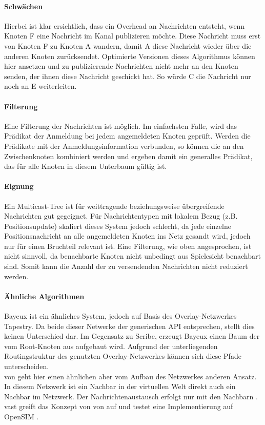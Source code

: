 \paragraph*{Schwächen}
Hierbei ist klar ersichtlich, dass ein Overhead an Nachrichten entsteht, wenn Knoten F eine Nachricht im Kanal publizieren möchte. Diese Nachricht muss erst von Knoten F zu Knoten A wandern, damit A diese Nachricht wieder über die anderen Knoten zurücksendet. Optimierte Versionen dieses Algorithmus können hier ansetzen und zu publizierende Nachrichten nicht mehr an den Knoten senden, der ihnen diese Nachricht geschickt hat. So würde C die Nachricht nur noch an E weiterleiten.

\paragraph*{Filterung}
Eine Filterung der Nachrichten ist möglich. Im einfachsten Falle, wird das Prädikat der Anmeldung bei jedem angemeldeten Knoten geprüft. Werden die Prädikate mit der Anmeldungsinformation verbunden, so können die an den Zwischenknoten kombiniert werden und ergeben damit ein generalles Prädikat, das für alle Knoten in diesem Unterbaum gültig ist.

\paragraph*{Eignung}
Ein Multicast-Tree ist für weittragende beziehungsweise übergreifende Nachrichten gut gegeignet. Für Nachrichtentypen mit lokalem Bezug (z.B. Positionsupdate) skaliert dieses System jedoch schlecht, da jede einzelne Positionsnachricht an alle angemeldeten Knoten ins Netz gesandt wird, jedoch nur für einen Bruchteil relevant ist. Eine Filterung, wie oben angesprochen, ist nicht sinnvoll, da benachbarte Knoten nicht unbedingt aus Spielesicht benachbart sind. Somit kann die Anzahl der zu versendenden Nachrichten nicht reduziert werden.

\paragraph*{Ähnliche Algorithmen}
Bayeux \cite{Zhuang2001} ist ein ähnliches System, jedoch auf Basis des Overlay-Netzwerkes Tapestry. Da beide dieser Netwerke der generischen API entsprechen, stellt dies keinen Unterschied dar. Im Gegensatz zu Scribe, erzeugt Bayeux einen Baum der vom Root-Knoten aus aufgebaut wird. Aufgrund der unterliegenden Routingstruktur des genutzten Overlay-Netzwerkes können sich diese Pfade unterscheiden.\\
\ac{von} geht hier einen ähnlichen aber vom Aufbau des Netzwerkes anderen Ansatz. In diesem Netzwerk ist ein Nachbar in der virtuellen Welt direkt auch ein Nachbar im Netzwerk. Der Nachrichtenaustausch erfolgt nur mit den Nachbarn \cite{Hu2006VON}. \ac{vast} \cite{Backhaus2007Voronoibased} greift das Konzept von \ac{von} auf und testet eine Implementierung auf OpenSIM \cite{Baumgart2007OverSim}.



